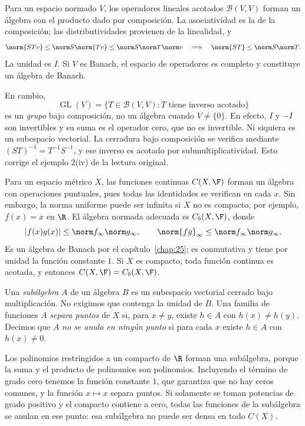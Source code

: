 \begin{ejemplo}
Para un espacio normado $V$, los operadores lineales acotados $\mathcal B(V,V)$ forman un álgebra con el producto dado por composición. La asociatividad es la de la composición; las distributividades provienen de la linealidad, y
\[
 \norm{STv}\le\norm S\norm{Tv}\le\norm S\norm T\norm v
 \quad\Longrightarrow\quad\norm{ST}\le\norm S\norm T.
\]
La unidad es $I$. Si $V$ es Banach, el espacio de operadores es completo y constituye un álgebra de Banach.

En cambio,
\[
 \operatorname{GL}(V)=\{T\in\mathcal B(V,V):T\text{ tiene inverso acotado}\}
\]
es un \emph{grupo} bajo composición, no un álgebra cuando $V\ne\{0\}$. En efecto, $I$ y $-I$ son invertibles y su suma es el operador cero, que no es invertible. Ni siquiera es un subespacio vectorial. La cerradura bajo composición se verifica mediante $(ST)^{-1}=T^{-1}S^{-1}$, y ese inverso es acotado por submultiplicatividad. Esto corrige el ejemplo 2(iv) de la lectura original.
\end{ejemplo}

\begin{ejemplo}
Para un espacio métrico $X$, las funciones continuas $C(X,\F)$ forman un álgebra con operaciones puntuales, pues todas las identidades se verifican en cada $x$. Sin embargo, la norma uniforme puede ser infinita si $X$ no es compacto; por ejemplo, $f(x)=x$ en $\R$. El álgebra normada adecuada es $C_b(X,\F)$, donde
\[
 |f(x)g(x)|\le\norm f_\infty\norm g_\infty,
 \qquad\norm{fg}_\infty\le\norm f_\infty\norm g_\infty.
\]
Es un álgebra de Banach por el capítulo~\ref{chap:25}; es conmutativa y tiene por unidad la función constante $1$. Si $X$ es compacto, toda función continua es acotada, y entonces $C(X,\F)=C_b(X,\F)$.
\end{ejemplo}

\begin{definicion}
Una \emph{subálgebra} $A$ de un álgebra $B$ es un subespacio vectorial cerrado bajo multiplicación. No exigimos que contenga la unidad de $B$. Una familia de funciones $A$ \emph{separa puntos} de $X$ si, para $x\ne y$, existe $h\in A$ con $h(x)\ne h(y)$. Decimos que $A$ \emph{no se anula en ningún punto} si para cada $x$ existe $h\in A$ con $h(x)\ne0$.
\end{definicion}

Los polinomios restringidos a un compacto de $\R$ forman una subálgebra, porque la suma y el producto de polinomios son polinomios. Incluyendo el término de grado cero tenemos la función constante $1$, que garantiza que no hay ceros comunes, y la función $x\mapsto x$ separa puntos. Si solamente se toman potencias de grado positivo y el compacto contiene a cero, todas las funciones de la subálgebra se anulan en ese punto: esa subálgebra no puede ser densa en todo $C(X)$.

